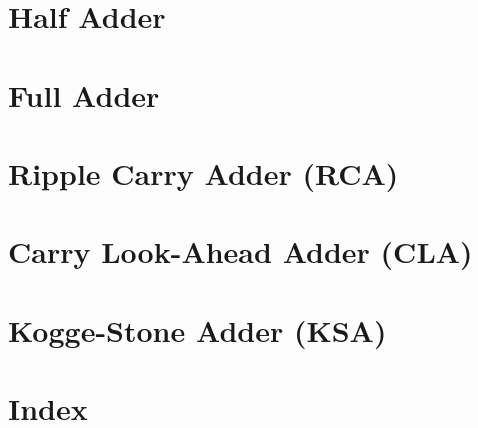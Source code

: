\documentclass[12pt,a4paper,oneside]{article}
\begin{document}
	\fontsize{13}{14}\selectfont
	\section{Half Adder}
%		
	
	\section{Full Adder}
		
	
	\section{Ripple Carry Adder (RCA)}
		
	
	\section{Carry Look-Ahead Adder (CLA)}
		
	
	\section{Kogge-Stone Adder (KSA)}
		
		
	\section{Index}
		
\end{document}
